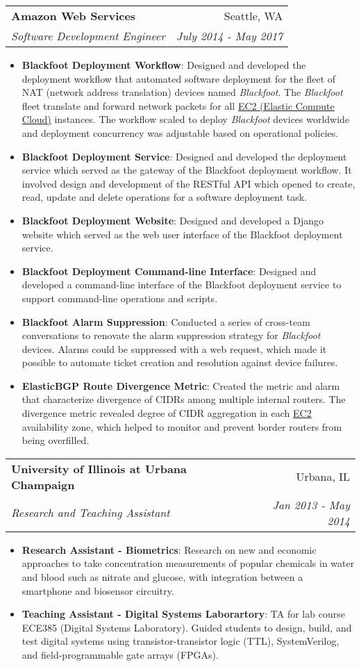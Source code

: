 \documentclass[letterpaper,11pt]{article}
\makeatletter
\newcommand{\resumeItem}[2]{
  \item\small{
    \textbf{#1}{: #2 \vspace{-2pt}}
  }
}
\newcommand{\resumeSubheading}[4]{
  \vspace{-1pt}\item
    \begin{tabular*}{0.97\textwidth}{l@{\extracolsep{\fill}}r}
      \textbf{#1} & #2 \\
      \textit{\small#3} & \textit{\small #4} \\
    \end{tabular*}\vspace{-5pt}
}
\newcommand{\resumeItemListStart}{\begin{itemize}}
\newcommand{\resumeItemListEnd}{\end{itemize}\vspace{-5pt}}
\makeatother
\begin{document}
    \resumeSubheading
      {Amazon Web Services}{Seattle, WA}
      {Software Development Engineer}{July 2014 - May 2017}
      \resumeItemListStart
        \resumeItem{Blackfoot Deployment Workflow}
          {Designed and developed the deployment workflow that automated software deployment for the fleet of NAT (network address translation) devices named \textit{Blackfoot}. The \textit{Blackfoot} fleet translate and forward network packets for all \href{https://aws.amazon.com/ec2/}{EC2 (Elastic Compute Cloud)} instances. The workflow scaled to deploy \textit{Blackfoot} devices worldwide and deployment concurrency was adjustable based on operational policies.}
        \resumeItem{Blackfoot Deployment Service}
          {Designed and developed the deployment service which served as the gateway of the Blackfoot deployment workflow. It involved design and development of the RESTful API which opened to create, read, update and delete operations for a software deployment task.}
        \resumeItem{Blackfoot Deployment Website}
          {Designed and developed a Django website which served as the web user interface of the Blackfoot deployment service.}
        \resumeItem{Blackfoot Deployment Command-line Interface}
          {Designed and developed a command-line interface of the Blackfoot deployment service to support command-line operations and scripts.}
        \resumeItem{Blackfoot Alarm Suppression}
          {Conducted a series of cross-team conversations to renovate the alarm suppression strategy for \textit{Blackfoot} devices. Alarms could be suppressed with a web request, which made it possible to automate ticket creation and resolution against device failures.  }
        \resumeItem{ElasticBGP Route Divergence Metric}
          {Created the metric and alarm that characterize divergence of CIDRs among multiple internal routers. The divergence metric revealed degree of CIDR aggregation in each \href{https://aws.amazon.com/ec2/}{EC2} availability zone, which helped to monitor and prevent border routers from being overfilled.}
      \resumeItemListEnd

    \resumeSubheading
      {University of Illinois at Urbana Champaign}{Urbana, IL}
      {Research and Teaching Assistant}{Jan 2013 - May 2014}
      \resumeItemListStart
        \resumeItem{Research Assistant - Biometrics}
          {Research on new and economic approaches to take concentration measurements of popular chemicals in water and blood such as nitrate and glucose, with integration between a smartphone and biosensor circuitry.}
        \resumeItem{Teaching Assistant - Digital Systems Laborartory}
          {TA for lab course ECE385 (Digital Systems Laboratory). Guided students to design, build, and test digital systems using transistor-transistor logic (TTL), SystemVerilog, and field-programmable gate arrays (FPGAs).}
      \resumeItemListEnd
\end{document}
